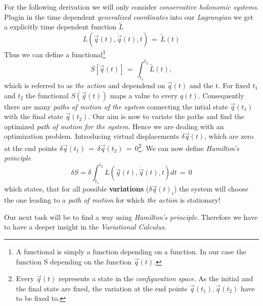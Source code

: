 For the following derivation we will only consider \textit{conservative holonomic
systems}. Plugin in the time dependent \textit{generalized coordinates} into
our \textit{Lagrangian} we get a explicitly time dependent function $\tilde L$
\begin{equation}
  L(\vec q(t), \dot{\vec q}(t), t) \,=\, \tilde L(t) 
\end{equation}
Thus we can define a functional\footnote{A functional is simply a function
depending on a function. In our case the function S depending on the function
$\vec q(t)$.}
\begin{equation}
  S[\vec q(t)] \,=\, \int_{t_1}^{t_2} \tilde L(t),
\end{equation}
which is referred to as \textit{the action} and dependend on $\vec q(t)$ and the t.
For fixed $t_1$ and $t_2$ the functional $S(\vec q(t))$ maps a value to every
$q(t)$. Consequently there are many \textit{paths of motion of the system}
connecting the intial state $\vec q(t_1)$ with the final state $\vec q(t_2)$.
Our aim is now to variate the paths and find the optimized
\textit{path of motion for the system}. Hence we are dealing with an optimization 
problem. Introducing virtual displacements $\delta \vec q(t)$, which are zero at the 
end points $\delta \vec q(t_1) \,=\, \delta \vec q(t_2) \,=\, 0$\footnote{Every $\vec
q(t)$ represents a state in the \textit{configuration space}. As the initial
and the final state are fixed, the variation at the end points $\vec q(t_1),
\vec q(t_2)$ have to be fixed to.}. We can now define \textit{Hamilton's
principle} 
\begin{equation}
  \delta S = \delta \int_{t_1}^{t_2} L(\vec q(t), \dot{\vec q}(t), t) dt \,=\, 0
\end{equation}
which states, that for all possible \textbf{variations} ($\delta \vec q(t)_i$) the system will choose the
one leading to a \textit{path of motion} for which \textit{the action} is
stationary!

Our next task will be to find a way using \textit{Hamilton's principle}.
Therefore we have to have a deeper insight in the \textit{Variational
Calculus}.

